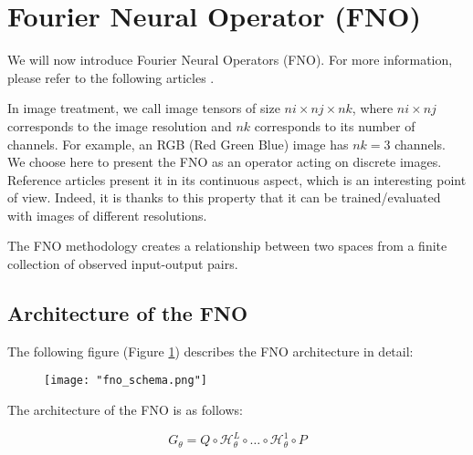 \section{Fourier Neural Operator (FNO)} \label{FNO}
\graphicspath{{images/fourier}}

We will now introduce Fourier Neural Operators (FNO). For more information, please refer to the following articles .

In image treatment, we call image tensors of size $ni\times nj\times nk$, where $ni\times nj$ corresponds to the image resolution and $nk$ corresponds to its number of channels. For example, an RGB (Red Green Blue) image has $nk=3$ channels. 
We choose here to present the FNO as an operator acting on discrete images. Reference articles present it in its continuous aspect, which is an interesting point of view. Indeed, it is thanks to this property that it can be trained/evaluated with images of different resolutions.

The FNO methodology creates a relationship between two spaces from a finite collection of observed input-output pairs. 


\subsection{Architecture of the FNO}

The following figure (Figure \ref{FNO_schema}) describes the FNO architecture in detail:

\begin{figure}[H]
	\texttt{[image: "fno\_schema.png"]}
	\label{FNO_schema}
\end{figure}

The architecture of the FNO is as follows:

\begin{equation*}
	G_\theta = Q \circ \mathcal{H}_\theta^L \circ \dots \circ \mathcal{H}_\theta^1 \circ P
\end{equation*}

\newpage

